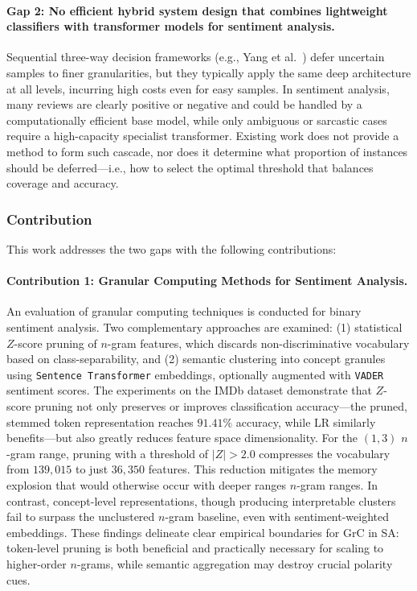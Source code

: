 \documentclass[a4paper,twoside,12pt]{book}
\newcommand{\zscore}{Z}
\newcommand{\logreg}{LR}
\newcommand{\code}[1]{\texttt{#1}}
\begin{document}
\paragraph{Gap 2: No efficient hybrid system design that combines lightweight classifiers with transformer models for sentiment analysis.}

Sequential three-way decision frameworks (e.g., Yang et al.~\cite{Yang2022temporal}) defer uncertain samples to finer granularities, but they typically apply the same deep architecture at all levels, incurring high costs even for easy samples. In sentiment analysis, many reviews are clearly positive or negative and could be handled by a computationally efficient base model, while only ambiguous or sarcastic cases require a high-capacity specialist transformer. Existing work does not provide a method to form such cascade, nor does it determine what proportion of instances should be deferred---i.e., how to select the optimal threshold that balances coverage and accuracy.

\subsubsection{Contribution}

This work addresses the two gaps with the following contributions:

\paragraph{Contribution 1: Granular Computing Methods for Sentiment Analysis.}
An evaluation of granular computing techniques is conducted for binary sentiment analysis. Two complementary approaches are examined: (1) statistical $\zscore$-score pruning of $n$-gram features, which discards non-discriminative vocabulary based on class-separability, and (2) semantic clustering into concept granules using \code{Sentence Transformer} embeddings, optionally augmented with \code{VADER} sentiment scores. The experiments on the IMDb dataset demonstrate that $\zscore$-score pruning not only preserves or improves classification accuracy---the pruned, stemmed token representation reaches $91.41\%$ accuracy, while \logreg{} similarly benefits---but also greatly reduces feature space dimensionality. For the $(1,3)$ $n$-gram range, pruning with a threshold of $|\zscore| > 2.0$ compresses the vocabulary from $139{,}015$ to just $36{,}350$ features. This reduction mitigates the memory explosion that would otherwise occur with deeper ranges $n$-gram ranges. In contrast, concept-level representations, though producing interpretable clusters fail to surpass the unclustered $n$-gram baseline, even with sentiment-weighted embeddings. These findings delineate clear empirical boundaries for GrC in SA: token-level pruning is both beneficial and practically necessary for scaling to higher-order $n$-grams, while semantic aggregation may destroy crucial polarity cues.
\end{document}
